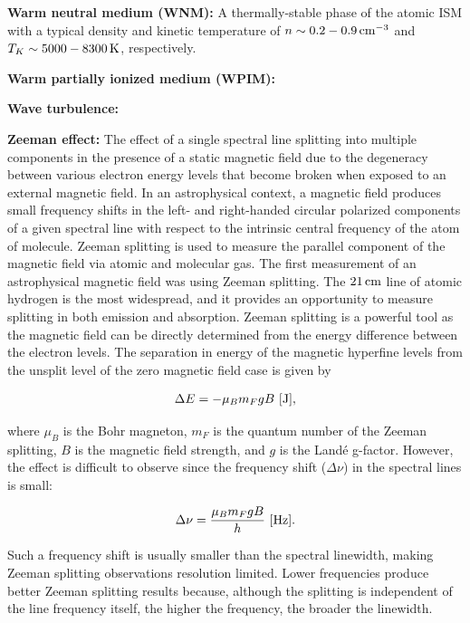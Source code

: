 \documentclass[a4paper,10pt]{article}
\begin{document}
{\noindent}\textbf{Warm neutral medium (WNM):} A thermally-stable phase of the atomic ISM with a typical density and kinetic temperature of $n\sim0.2-0.9\,{\rm cm^{-3}}$ and $T_K\sim5000-8300\,{\rm K}$, respectively.

{\noindent}\textbf{Warm partially ionized medium (WPIM):}

{\noindent}\textbf{Wave turbulence:}

{\noindent}\textbf{Zeeman effect:} The effect of a single spectral line splitting into multiple components in the presence of a static magnetic field due to the degeneracy between various electron energy levels that become broken when exposed to an external magnetic field. In an astrophysical context, a magnetic field produces small frequency shifts in the left- and right-handed circular polarized components of a given spectral line with respect to the intrinsic central frequency of the atom of molecule. Zeeman splitting is used to measure the parallel component of the magnetic field via atomic and molecular gas. The first measurement of an astrophysical magnetic field was using Zeeman splitting. The $21\,{\rm cm}$ line of atomic hydrogen is the most widespread, and it provides an opportunity to measure splitting in both emission and absorption. Zeeman splitting is a powerful tool as the magnetic field can be directly determined from the energy difference between the electron levels. The separation in energy of the magnetic hyperfine levels from the unsplit level of the zero magnetic field case is given by

\begin{align*}
    \Delta E = -\mu_Bm_FgB ~ [{\rm J}],
\end{align*}

{\noindent}where $\mu_B$ is the Bohr magneton, $m_F$ is the quantum number of the Zeeman splitting, $B$ is the magnetic field strength, and $g$ is the Land\'e g-factor. However, the effect is difficult to observe since the frequency shift ($\Delta\nu$) in the spectral lines is small:

\begin{align*}
    \Delta\nu = \frac{\mu_Bm_FgB}{h} ~ [{\rm Hz}].
\end{align*}

{\noindent}Such a frequency shift is usually smaller than the spectral linewidth, making Zeeman splitting observations resolution limited. Lower frequencies produce better Zeeman splitting results because, although the splitting is independent of the line frequency itself, the higher the frequency, the broader the linewidth.
\end{document}
